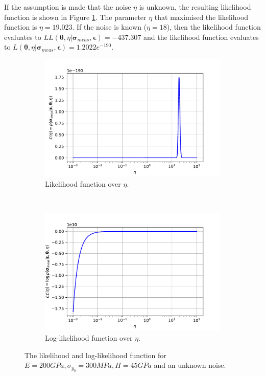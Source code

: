 \documentclass{article}
\begin{document}
	If the assumption is made that the noise $\eta$ is unknown, the resulting likelihood function is shown in Figure \ref{fig:Q3_noise_LL}. The parameter $\eta$ that maximised the likelihood function is $\eta = 19.023$. If the noise is known ($\eta = 18$), then the likelihood function evaluates to $LL(\boldsymbol\theta, \eta \vert \boldsymbol\sigma_{meas}, \boldsymbol\epsilon) = -437.307$ and the likelihood function evaluates to $L(\boldsymbol\theta, \eta \vert \boldsymbol\sigma_{meas}, \boldsymbol\epsilon) = 1.2022e^{-190}$.
	\begin{figure}[htb!]
		\centering
		\begin{subfigure}[b]{0.45\textwidth}
			\centering
			\includegraphics[width=\textwidth]{Q3b_2.pdf}
			\caption{Likelihood function over $\eta$.}
		\end{subfigure}
		~
		\begin{subfigure}[b]{0.45\textwidth}
			\centering
			\includegraphics[width=\textwidth]{Q3b_1.pdf}
			\caption{Log-likelihood function over $\eta$.}
		\end{subfigure}
		
		\caption{The likelihood and log-likelihood function for $E = 200 GPa, \sigma_{y_0} = 300 MPa, H = 45 GPa$ and an unknown noise.}
		\label{fig:Q3_noise_LL}
	\end{figure}
\end{document}
